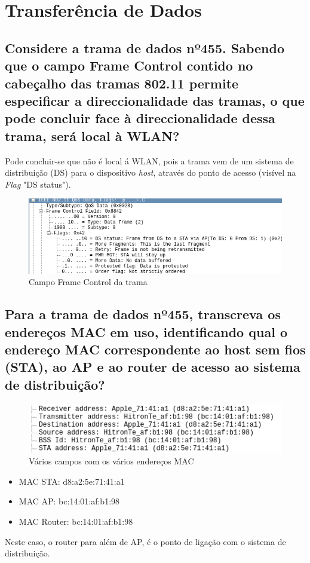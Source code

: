 \documentclass[a4paper]{article}
\begin{document}
\section{Transferência de Dados}
\setcounter{subsection}{13}

\subsection{Considere a trama de dados nº455. Sabendo que o campo Frame Control contido
no cabeçalho das tramas 802.11 permite especificar a direccionalidade das
tramas, o que pode concluir face à direccionalidade dessa trama, será local à
WLAN?}
Pode concluir-se que não é local á WLAN, pois a trama vem de um sistema de distribuição (DS) para o dispositivo \textit{host}, através do ponto de acesso (visível na \textit{Flag} "DS status").
\begin{figure}[H]
\centering
\includegraphics[scale=0.50]{pics/p14.png}
\caption{Campo Frame Control da trama}
\end{figure}



\subsection{Para a trama de dados nº455, transcreva os endereços MAC em uso,
identificando qual o endereço MAC correspondente ao host sem fios (STA), ao AP
e ao router de acesso ao sistema de distribuição?}
\begin{figure}[H]
\centering
\includegraphics[scale=0.70]{pics/p15.png}
\caption{Vários campos com os vários endereços MAC}
\end{figure}
\begin{itemize}
    \item MAC STA: d8:a2:5e:71:41:a1
    \item MAC AP: bc:14:01:af:b1:98	
    \item MAC Router: bc:14:01:af:b1:98
\end{itemize}
Neste caso, o router para além de AP, é o ponto de ligação com o sistema de distribuição.
\end{document}
